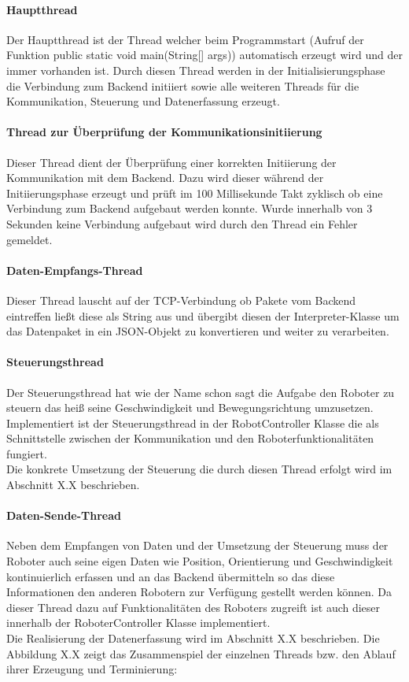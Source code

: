 \paragraph{Hauptthread}
Der Hauptthread ist der Thread welcher beim Programmstart (Aufruf der Funktion public static void main(String[] args)) automatisch 
erzeugt wird und der immer vorhanden ist. Durch diesen Thread werden in der Initialisierungsphase die Verbindung zum Backend initiiert 
sowie alle weiteren Threads für die Kommunikation, Steuerung und Datenerfassung erzeugt. 
\paragraph{Thread zur Überprüfung der Kommunikationsinitiierung}
Dieser Thread dient der Überprüfung einer korrekten Initiierung der Kommunikation mit dem Backend. Dazu wird dieser während der 
Initiierungsphase erzeugt und prüft im 100 Millisekunde Takt zyklisch ob eine Verbindung zum Backend aufgebaut werden konnte. Wurde
innerhalb von 3 Sekunden keine Verbindung aufgebaut wird durch den Thread ein Fehler gemeldet.
\paragraph{Daten-Empfangs-Thread}
Dieser Thread lauscht auf der TCP-Verbindung ob Pakete vom Backend eintreffen ließt diese als String aus und übergibt diesen der 
Interpreter-Klasse um das Datenpaket in ein JSON-Objekt zu konvertieren und weiter zu verarbeiten.
\paragraph{Steuerungsthread}
Der Steuerungsthread hat wie der Name schon sagt die Aufgabe den Roboter zu steuern das heiß seine Geschwindigkeit und Bewegungsrichtung 
umzusetzen. Implementiert ist der Steuerungsthread in der RobotController Klasse die als Schnittstelle zwischen der Kommunikation und den
Roboterfunktionalitäten fungiert. \\
Die konkrete Umsetzung der Steuerung die durch diesen Thread erfolgt wird im Abschnitt X.X beschrieben.
\paragraph{Daten-Sende-Thread}
Neben dem Empfangen von Daten und der Umsetzung der Steuerung muss der Roboter auch seine eigen Daten wie Position, Orientierung und 
Geschwindigkeit kontinuierlich erfassen und an das Backend übermitteln so das diese Informationen den anderen Robotern zur Verfügung
gestellt werden können. Da dieser Thread dazu auf Funktionalitäten des Roboters zugreift ist auch dieser innerhalb der RoboterController
Klasse implementiert.
\\
Die Realisierung der Datenerfassung wird im Abschnitt X.X beschrieben.
\medskip
\newline
Die Abbildung X.X zeigt das Zusammenspiel der einzelnen Threads bzw. den Ablauf ihrer Erzeugung und Terminierung:
